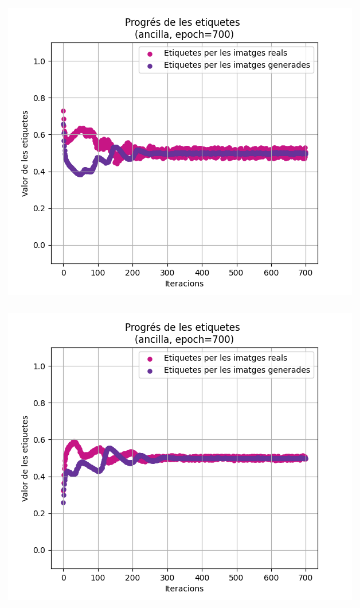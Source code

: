 \begin{figure}[H]
	\begin{subfigure}[b]{.32\linewidth}
		\includegraphics[width=\linewidth]{figures/data/L_A4.png}
		\caption{}
	\end{subfigure}
	\begin{subfigure}[b]{.32\linewidth}
		\includegraphics[width=\linewidth]{figures/data/L_A5.png}
		\caption{}
	\end{subfigure}
	\begin{subfigure}[b]{.32\linewidth}

\end{subfigure}
\end{figure}
